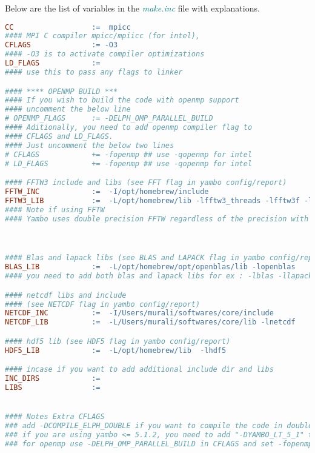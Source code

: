 \documentclass[12pt,twoside,openany]{book}
\begin{document}
Below are the list of variables in the {\textcolor{teal}{\emph{make.inc}}} file with 
explanations.
\begin{lstlisting}[language=make]
CC                  :=  mpicc
#### MPI C compiler mpicc/mpiicc (for intel), 
CFLAGS              := -O3
#### -O3 is to activate compiler optimizations
LD_FLAGS            := 
#### use this to pass any flags to linker

#### **** OPENMP BUILD ***
#### If you wish to build the code with openmp support
#### uncomment the below line 
# OPENMP_FLAGS   	:= -DELPH_OMP_PARALLEL_BUILD 
#### Aditionally, you need to add openmp compiler flag to 
#### CFLAGS and LD_FLAGS.
#### Just uncomment the below two lines
# CFLAGS            += -fopenmp ## use -qopenmp for intel
# LD_FLAGS          += -fopenmp ## use -qopenmp for intel

#### FFTW3 include and libs (see FFT flag in yambo config/report)
FFTW_INC 	        :=  -I/opt/homebrew/include 
FFTW3_LIB           :=  -L/opt/homebrew/lib -lfftw3_threads -lfftw3f -lfftw3f_omp -lfftw3_omp -lfftw3
#### Note if using FFTW
#### Yambo uses double precision FFTW regardless of the precision with which Yambo is built. In contrast, you need to link single (double) precision FFTW for single (double) precision LetzElPhC. please refer to https://www.fftw.org/fftw3_doc/Precision.html . Also you refer to https://www.fftw.org/fftw3_doc/Multi_002dthreaded-FFTW.html  if compiling with openmp support.



#### Blas and lapack libs (see BLAS and LAPACK flag in yambo config/report)
BLAS_LIB 	        :=  -L/opt/homebrew/opt/openblas/lib -lopenblas 
#### you need to add both blas and lapack libs for ex : -lblas -llapack

#### netcdf libs and include
#### (see NETCDF flag in yambo config/report)
NETCDF_INC          :=  -I/Users/murali/softwares/core/include 
NETCDF_LIB 	        :=  -L/Users/murali/softwares/core/lib -lnetcdf

#### hdf5 lib (see HDF5 flag in yambo config/report)
HDF5_LIB            :=  -L/opt/homebrew/lib  -lhdf5

#### incase if you want to add additional include dir and libs
INC_DIRS            := 
LIBS                := 


#### Notes Extra CFLAGS
### add -DCOMPILE_ELPH_DOUBLE if you want to compile the code in double precession
### if you are using yambo <= 5.1.2, you need to add "-DYAMBO_LT_5_1" to cflags
### for openmp use -DELPH_OMP_PARALLEL_BUILD in CFLAGS and set -fopenmp in LD_FLAGS and CFLAGS
\end{lstlisting}
\end{document}
